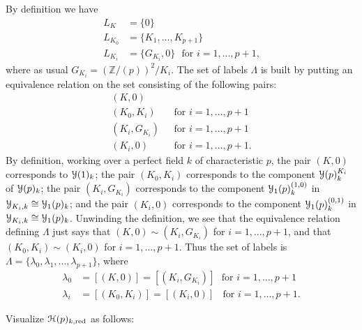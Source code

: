 \documentclass[11pt]{amsart}
\theoremstyle{definition}
\begin{document}
By definition we have 
\begin{align*}
L_K & = \{0\} \\
L_{K_0} & = \{K_1,...,K_{p+1}\} \\
L_{K_i} & = \{G_{K_i},0\}\:\:\:\textrm{for $i = 1,...,p+1$,} 
\end{align*}
where as usual $G_{K_i} = (\mathbb{Z}/(p))^2/K_i$. The set of labels $\Lambda$ is built by putting an equivalence relation on the set consisting of the following pairs:
\begin{align*}
(K,0)\:\:\: & \\
(K_0,K_i)\:\:\: & \textrm{for $i = 1,...,p+1$} \\
(K_i,G_{K_i})\:\:\: & \textrm{for $i = 1,...,p+1$} \\
(K_i,0)\:\:\: & \textrm{for $i = 1,...,p+1$}.
\end{align*}
By definition, working over a perfect field $k$ of characteristic $p$, the pair $(K,0)$ corresponds to ${\mathbf{\EuScript{Y}}}(1)_k$; the pair $(K_0,K_i)$ corresponds to the component ${\mathbf{\EuScript{Y}}}(p)^{K_i}_k$ of ${\mathbf{\EuScript{Y}}}(p)_k$; the pair $(K_i,G_{K_i})$ corresponds to the component ${\mathbf{\EuScript{Y}}}_1(p)^{(1,0)}_k$ in ${\mathbf{\EuScript{Y}}}_{K_i,k} \cong {\mathbf{\EuScript{Y}}}_1(p)_k$; and the pair $(K_i,0)$ corresponds to the component ${\mathbf{\EuScript{Y}}}_1(p)^{(0,1)}_k$ in ${\mathbf{\EuScript{Y}}}_{K_i,k} \cong {\mathbf{\EuScript{Y}}}_1(p)_k$. Unwinding the definition, we see that the equivalence relation defining $\Lambda$ just says that $(K,0) \sim (K_i,G_{K_i})$ for $i = 1,...,p+1$, and that $(K_0,K_i) \sim (K_i,0)$ for $i = 1,...,p+1$. Thus the set of labels is $\Lambda = \{\lambda_0,\lambda_1, ..., \lambda_{p+1}\}$, where 
\begin{align*}
\lambda_0 & = [(K,0)] = [(K_i,G_{K_i})]\:\:\:\textrm{for $i = 1,...,p+1$} \\
\lambda_i & = [(K_0,K_i)] = [(K_i,0)]\:\:\:\:\textrm{for $i = 1,...,p+1$.}
\end{align*}

Visualize ${\mathbf{\EuScript{H}}}(p)_{k,\mathrm{red}}$ as follows:
\end{document}

